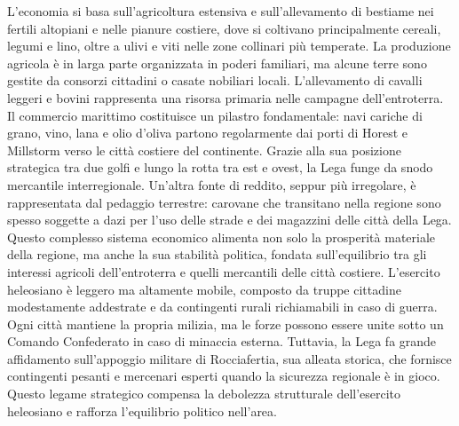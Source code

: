 \documentclass[10pt, a4paper]{report}
\begin{document}
\begin{multicols}{2}
L’economia si basa sull’agricoltura estensiva e sull’allevamento di bestiame nei fertili altopiani e nelle pianure costiere, dove si coltivano principalmente cereali, legumi e lino, oltre a ulivi e viti nelle zone collinari più temperate. La produzione agricola è in larga parte organizzata in poderi familiari, ma alcune terre sono gestite da consorzi cittadini o casate nobiliari locali. L’allevamento di cavalli leggeri e bovini rappresenta una risorsa primaria nelle campagne dell'entroterra.
Il commercio marittimo costituisce un pilastro fondamentale: navi cariche di grano, vino, lana e olio d'oliva partono regolarmente dai porti di Horest e Millstorm verso le città costiere del continente. Grazie alla sua posizione strategica tra due golfi e lungo la rotta tra est e ovest, la Lega funge da snodo mercantile interregionale.
Un’altra fonte di reddito, seppur più irregolare, è rappresentata dal pedaggio terrestre: carovane che transitano nella regione sono spesso soggette a dazi per l’uso delle strade e dei magazzini delle città della Lega.
Questo complesso sistema economico alimenta non solo la prosperità materiale della regione, ma anche la sua stabilità politica, fondata sull’equilibrio tra gli interessi agricoli dell’entroterra e quelli mercantili delle città costiere.
L’esercito heleosiano è leggero ma altamente mobile, composto da truppe cittadine modestamente addestrate e da contingenti rurali richiamabili in caso di guerra. Ogni città mantiene la propria milizia, ma le forze possono essere unite sotto un Comando Confederato in caso di minaccia esterna. Tuttavia, la Lega fa grande affidamento sull’appoggio militare di Rocciafertia, sua alleata storica, che fornisce contingenti pesanti e mercenari esperti quando la sicurezza regionale è in gioco. Questo legame strategico compensa la debolezza strutturale dell’esercito heleosiano e rafforza l’equilibrio politico nell’area.


\end{multicols}
\end{document}
